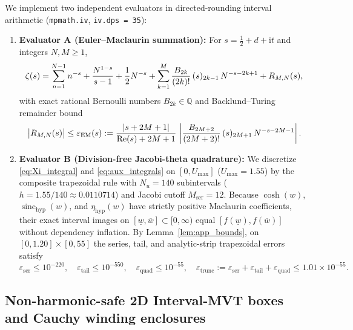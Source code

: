 \documentclass[11pt,a4paper,reqno]{amsart}
\theoremstyle{definition}
\theoremstyle{remark}
\numberwithin{equation}{section}
\newcommand{\ii}{\mathrm{i}}
\newcommand{\Rea}{\operatorname{Re}}
\newcommand{\sinch}{\operatorname{sinc}_{\mathrm{hyp}}}
\newcommand{\etah}{\eta_{\mathrm{hyp}}}
\newcommand{\fac}{\mathclose{\mathchar"0021}}
\begin{document}
We implement two independent evaluators in directed-rounding interval arithmetic (\texttt{mpmath.iv}, \texttt{iv.dps = 35}):
\begin{enumerate}
\item \textbf{Evaluator A (Euler--Maclaurin summation):} For $s = \frac{1}{2}+d+\ii t$ and integers $N, M \ge 1$,
\begin{equation}\label{eq:em_zeta}
\zeta(s) = \sum_{n=1}^{N-1} n^{-s} + \frac{N^{1-s}}{s-1} + \frac{1}{2}N^{-s} + \sum_{k=1}^M \frac{B_{2k}}{(2k)\fac}\,(s)_{2k-1}\,N^{-s-2k+1} + R_{M,N}(s),
\end{equation}
with exact rational Bernoulli numbers $B_{2k} \in \mathbb{Q}$ and Backlund--Turing remainder bound \cite{Turing1953,Titchmarsh1986}
\begin{equation}\label{eq:em_rem_bound}
\big|R_{M,N}(s)\big| \le \varepsilon_{\mathrm{EM}}(s) := \frac{|s + 2M + 1|}{\Rea(s) + 2M + 1}\,\left|\frac{B_{2M+2}}{(2M+2)\fac}\,(s)_{2M+1}\,N^{-s-2M-1}\right|.
\end{equation}
\item \textbf{Evaluator B (Division-free Jacobi-theta quadrature):} We discretize \eqref{eq:Xi_integral} and \eqref{eq:aux_integrals} on $[0, U_{\max}]$ ($U_{\max} = 1.55$) by the composite trapezoidal rule with $N_u = 140$ subintervals ($h = 1.55/140 \approx 0.0110714$) and Jacobi cutoff $M_{\mathrm{ser}} = 12$. Because $\cosh(w)$, $\sinch(w)$, and $\etah(w)$ have strictly positive Maclaurin coefficients, their exact interval images on $[\underline{w}, \overline{w}] \subset [0,\infty)$ equal $[f(\underline{w}), f(\overline{w})]$ without dependency inflation. By Lemma~\ref{lem:app_bounds}, on $[0, 1.20] \times [0, 55]$ the series, tail, and analytic-strip trapezoidal errors satisfy
\begin{equation}\label{eq:trunc_summary}
\varepsilon_{\mathrm{ser}} \le 10^{-220}, \quad \varepsilon_{\mathrm{tail}} \le 10^{-550}, \quad \varepsilon_{\mathrm{quad}} \le 10^{-55}, \quad \varepsilon_{\mathrm{trunc}} := \varepsilon_{\mathrm{ser}} + \varepsilon_{\mathrm{tail}} + \varepsilon_{\mathrm{quad}} \le 1.01 \times 10^{-55}.
\end{equation}
\end{enumerate}

\subsection{Non-harmonic-safe 2D Interval-MVT boxes and Cauchy winding enclosures}\label{subsec:mvt_and_cauchy}
\end{document}
